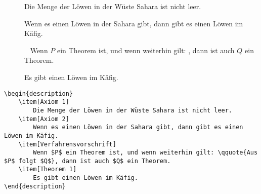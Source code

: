 \documentclass["WS\space 16-17\space -\space LaTeX-Kurs\space -\space Praesentation\space -\space 2.tex"]{subfiles}
\begin{document}
\begin{frame}[fragile]
	\vspace{-0.2cm}
	\Losung
	\begin{outputbox}
		\vspace{-0.2cm}
		\begin{description}
			\item[{\makebox[0.5cm]{}}]
				Die Menge der Löwen in der Wüste Sahara ist nicht leer.
			\item[{\makebox[0.5cm]{}}]
				Wenn es einen Löwen in der Sahara gibt, dann gibt es einen Löwen im Käfig.
			\item[{\makebox[0.5cm]{}}]\ \newline
				Wenn $P$ ein Theorem ist, und wenn weiterhin gilt: , dann ist auch $Q$ ein Theorem.
			\item[{\makebox[0.5cm]{}}]
				Es gibt einen Löwen im Käfig.
		\end{description}
		\vspace{-0.2cm}
	\end{outputbox}
	
	\Code
	\vspace{-0.1cm}
	\begin{lstlisting}
\begin{description}
	\item[Axiom 1]
		Die Menge der Löwen in der Wüste Sahara ist nicht leer.
	\item[Axiom 2]
		Wenn es einen Löwen in der Sahara gibt, dann gibt es einen Löwen im Käfig.
	\item[Verfahrensvorschrift]
		Wenn $P$ ein Theorem ist, und wenn weiterhin gilt: \qquote{Aus $P$ folgt $Q$}, dann ist auch $Q$ ein Theorem.
	\item[Theorem 1]
		Es gibt einen Löwen im Käfig.
\end{description}
	\end{lstlisting}
\end{frame}
\end{document}
